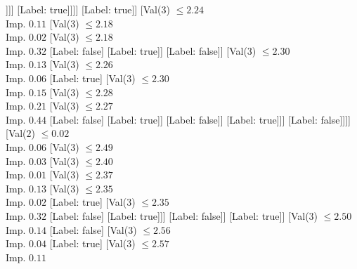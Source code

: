 \documentclass[margin=10pt]{standalone}
\begin{document}
\begin{forest}
														[Label: false]
														[Val($2$) $ \leq 0.02$ \\ Imp. $0.14$
															[Val($3$) $ \leq 2.14$ \\ Imp. $0.26$
																[Label: true]
																[Val($3$) $ \leq 2.15$ \\ Imp. $0.12$
																	[Label: false]
																	[Val($3$) $ \leq 2.16$ \\ Imp. $0.50$
																		[Label: true]
																		[Label: false]]]]
															[Label: true]]]]
												[Label: true]]
											[Val($3$) $ \leq 2.24$ \\ Imp. $0.11$
												[Val($3$) $ \leq 2.18$ \\ Imp. $0.02$
													[Val($3$) $ \leq 2.18$ \\ Imp. $0.32$
														[Label: false]
														[Label: true]]
													[Label: false]]
												[Val($3$) $ \leq 2.30$ \\ Imp. $0.13$
													[Val($3$) $ \leq 2.26$ \\ Imp. $0.06$
														[Label: true]
														[Val($3$) $ \leq 2.30$ \\ Imp. $0.15$
															[Val($3$) $ \leq 2.28$ \\ Imp. $0.21$
																[Val($3$) $ \leq 2.27$ \\ Imp. $0.44$
																	[Label: false]
																	[Label: true]]
																[Label: false]]
															[Label: true]]]
													[Label: false]]]]
										[Val($2$) $ \leq 0.02$ \\ Imp. $0.06$
											[Val($3$) $ \leq 2.49$ \\ Imp. $0.03$
												[Val($3$) $ \leq 2.40$ \\ Imp. $0.01$
													[Val($3$) $ \leq 2.37$ \\ Imp. $0.13$
														[Val($3$) $ \leq 2.35$ \\ Imp. $0.02$
															[Label: true]
															[Val($3$) $ \leq 2.35$ \\ Imp. $0.32$
																[Label: false]
																[Label: true]]]
														[Label: false]]
													[Label: true]]
												[Val($3$) $ \leq 2.50$ \\ Imp. $0.14$
													[Label: false]
													[Val($3$) $ \leq 2.56$ \\ Imp. $0.04$
														[Label: true]
														[Val($3$) $ \leq 2.57$ \\ Imp. $0.11$

\end{forest}
\end{document}

